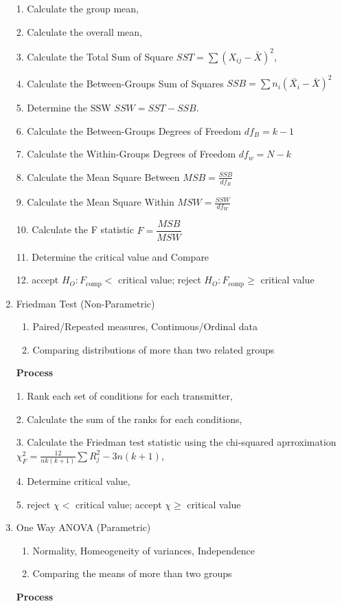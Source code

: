 \documentclass[4pt]{article}
\begin{document}
\begin{multicols*}{2}
\begin{enumerate}
        1. Calculate the group mean,

        2. Calculate the overall mean, 

        3. Calculate the Total Sum of Square $ SST = \sum{(X_{ij} - \bar{X})^2}$,

        4. Calculate the Between-Groups Sum of Squares $ SSB = \sum{n_i(\bar{X_i}-\bar{X})^2}$

        5. Determine the SSW $SSW = SST - SSB$.
        
        6. Calculate the Between-Groups Degrees of Freedom $ df_B = k - 1$

        7. Calculate the Within-Groups Degrees of Freedom $ df_w = N - k$

        8. Calculate the Mean Square Between $ MSB = \frac{SSB}{df_B}$

        9. Calculate the Mean Square Within $ MSW = \frac{SSW}{df_W}$

        10. Calculate the F statistic $ F = \dfrac{MSB}{MSW}$

        11. Determine the critical value and Compare

        12. accept $H_O: F_{\text{comp}} <$ critical value; reject $H_O: F_{\text{comp}} \geq$ critical value

        \item Friedman Test (Non-Parametric)
        \begin{enumerate}
            \item Paired/Repeated measures, Continuous/Ordinal data
            \item Comparing distributions of more than two related groups
        \end{enumerate}
        \textbf{Process}
            
        1. Rank each set of conditions for each transmitter, 
    
        2. Calculate the sum of the ranks for each conditions,

        3. Calculate the Friedman test statistic using the chi-squared aprroximation $\chi_F^2 = \frac{12}{nk(k+1)}\sum{R_j^2-3n(k+1)}$,
    
        4. Determine critical value,

        5. reject $\chi <$ critical value; accept $\chi \geq$ critical value

        \item One Way ANOVA (Parametric)
        \begin{enumerate}
            \item Normality, Homeogeneity of variances, Independence
            \item Comparing the means of more than two groups
        \end{enumerate}
        \textbf{Process}


\end{enumerate}
\end{multicols*}
\end{document}
